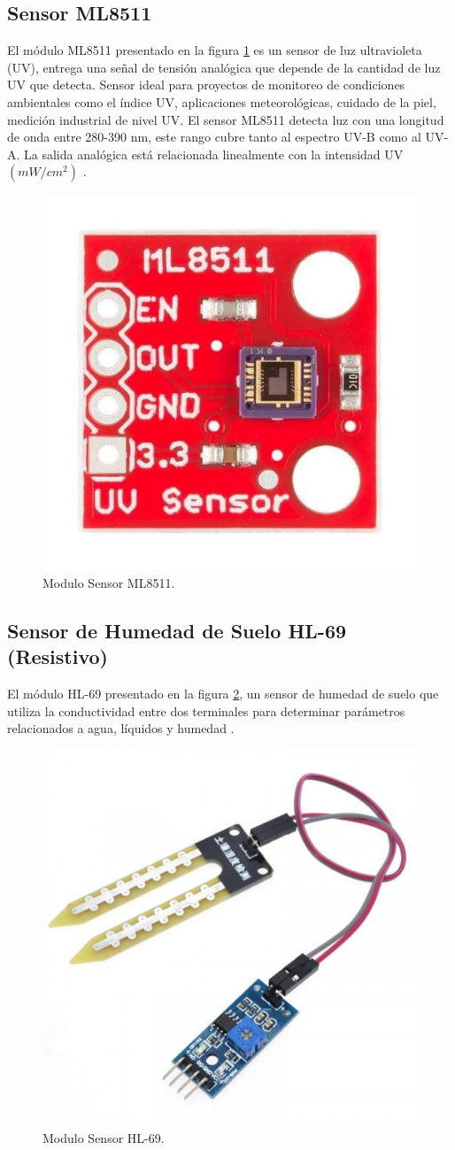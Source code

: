 \subsection{Sensor ML8511}

El módulo ML8511 presentado en la figura \ref{fig:SensorML8511} es un sensor de luz ultravioleta (UV), entrega una señal de tensión analógica que depende de la cantidad de luz UV que detecta. Sensor ideal para proyectos de monitoreo de condiciones ambientales como el índice UV, aplicaciones meteorológicas, cuidado de la piel, medición industrial de nivel UV.
El sensor ML8511 detecta luz con una longitud de onda entre 280-390 nm, este rango cubre tanto al espectro UV-B como al UV-A. La salida analógica está relacionada linealmente con la intensidad UV $(mW/cm^2)$ \citep{ModuloML8511}.
\begin{figure}[htbp]
	\centering
	\includegraphics[width=.3\textwidth]{./Figures/ml8511.jpg}
	\caption{Modulo Sensor ML8511.}
	\label{fig:SensorML8511}
\end{figure}
\subsection{Sensor de Humedad de Suelo HL-69 (Resistivo)}
El módulo HL-69 presentado en la figura \ref{fig:SensorHL-69}, un sensor de humedad de suelo que utiliza la conductividad entre dos terminales para determinar parámetros relacionados a agua, líquidos y humedad \citep{ModuloHL-69}.
\begin{figure}[htbp]
	\centering
	\includegraphics[width=.4\textwidth]{./Figures/sensordehumedad.jpg}
	\caption{Modulo Sensor HL-69.}
	\label{fig:SensorHL-69}
\end{figure}

